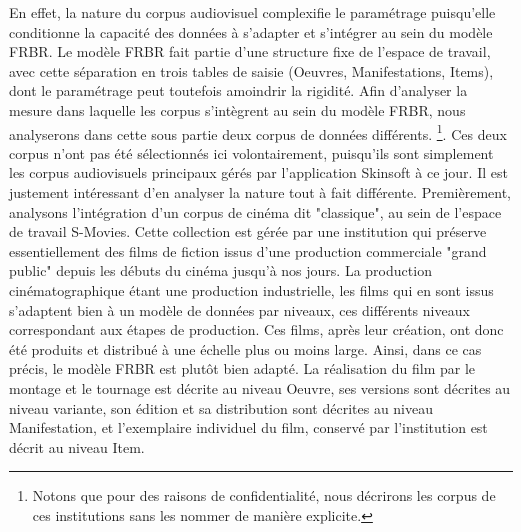 En effet, la nature du corpus audiovisuel complexifie le paramétrage puisqu'elle conditionne la capacité des données à s'adapter et  s'intégrer au sein du modèle FRBR. Le modèle FRBR fait partie d'une structure fixe de l'espace de travail, avec cette séparation en trois tables de saisie (Oeuvres, Manifestations, Items), dont le paramétrage peut toutefois amoindrir la rigidité. Afin d'analyser la mesure dans laquelle les corpus s'intègrent au sein du modèle FRBR, nous analyserons dans cette sous partie deux corpus de données différents. \footnote{Notons que pour des raisons de confidentialité, nous décrirons les corpus de ces institutions sans les nommer de manière explicite.}. Ces deux corpus n'ont pas été sélectionnés ici volontairement, puisqu'ils sont simplement les corpus audiovisuels principaux gérés par l'application Skinsoft à ce jour. Il est justement intéressant d'en analyser la nature tout à fait différente. 
Premièrement, analysons l'intégration d'un corpus de cinéma dit "classique", au sein de l'espace de travail S-Movies. Cette collection est gérée par une institution qui préserve essentiellement des films de fiction issus d'une production commerciale "grand public" depuis les débuts du cinéma jusqu'à nos jours. La production cinématographique étant une production industrielle, les films qui en sont issus s'adaptent bien à un modèle de données par niveaux, ces différents niveaux correspondant aux étapes de production. Ces films, après leur création, ont donc été produits et distribué à une échelle plus ou moins large. Ainsi, dans ce cas précis, le modèle FRBR est plutôt bien adapté. La réalisation du film par le montage et le tournage est décrite au niveau Oeuvre, ses versions sont décrites au niveau variante, son édition et sa distribution sont décrites au niveau Manifestation, et l'exemplaire individuel du film, conservé par l'institution est décrit au niveau Item.



